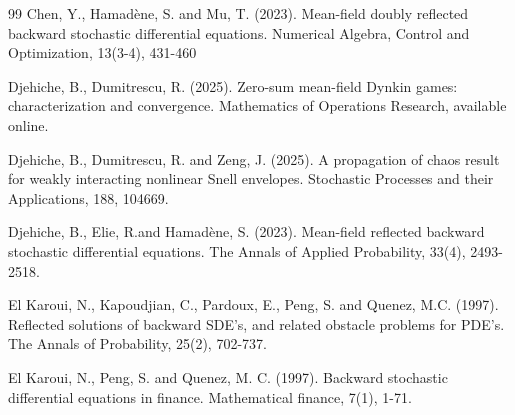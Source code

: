 \documentclass[10pt]{article}%
\numberwithin{equation}{section}
\begin{document}
\begin{thebibliography}{99}
 Chen, Y., Hamadène, S. and  Mu, T. (2023). Mean-field doubly reflected backward stochastic differential equations. Numerical Algebra, Control and Optimization, 13(3-4), 431-460





 Djehiche, B., Dumitrescu, R. (2025). Zero-sum mean-field Dynkin games: characterization and convergence. Mathematics of Operations Research, available online.

 Djehiche, B., Dumitrescu, R. and Zeng, J. (2025). A propagation of chaos result for weakly interacting nonlinear Snell envelopes. Stochastic Processes and their Applications, 188, 104669.

 Djehiche, B., Elie, R.and Hamadène, S. (2023). Mean-field reflected backward stochastic differential equations. The Annals of Applied Probability, 33(4), 2493-2518.


 El Karoui, N., Kapoudjian, C., Pardoux, E., Peng, S. and Quenez, M.C. (1997). Reflected solutions
of backward SDE’s, and related obstacle problems for PDE’s. The Annals of Probability, 25(2), 702-737.

 El Karoui, N., Peng, S. and Quenez, M. C. (1997). Backward stochastic differential equations in finance. Mathematical finance, 7(1), 1-71.


\end{thebibliography}
\end{document}

